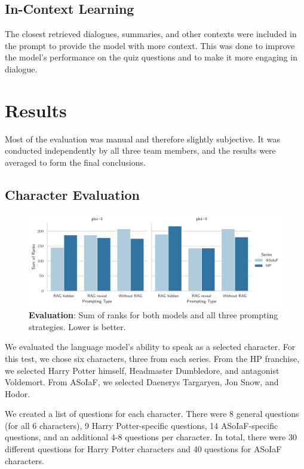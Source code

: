 \documentclass[fleqn,moreauthors,10pt]{ds_report}
\begin{document}
\subsection*{In-Context Learning}

The closest retrieved dialogues, summaries, and other contexts were included in the prompt to provide the model with more context. This was done to improve the model's performance on the quiz questions and to make it more engaging in dialogue.


\section*{Results}

Most of the evaluation was manual and therefore slightly subjective. It was conducted independently by all three team members, and the results were averaged to form the final conclusions.

\subsection*{Character Evaluation}

\begin{figure}[hbt]
	\centering
	\includegraphics[width=0.8\linewidth]{questioners-results.pdf}
	\caption{\textbf{Evaluation}: Sum of ranks for both models and all three prompting strategies. Lower is better.}
	\label{fig:character_evaluation_results}
\end{figure}

We evaluated the language model's ability to speak as a selected character. For this test, we chose six characters, three from each series. From the HP franchise, we selected Harry Potter himself, Headmaster Dumbledore, and antagonist Voldemort. From ASoIaF, we selected Daenerys Targaryen, Jon Snow, and Hodor.

We created a list of questions for each character. There were 8 general questions (for all 6 characters), 9 Harry Potter-specific questions, 14 ASoIaF-specific questions, and an additional 4-8 questions per character. In total, there were 30 different questions for Harry Potter characters and 40 questions for ASoIaF characters.
\end{document}
